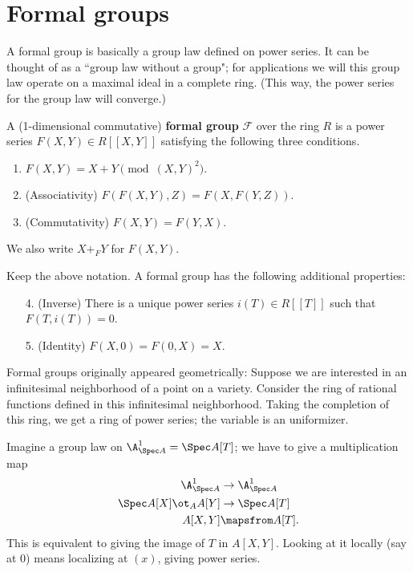 \section{Formal groups}
A formal group is basically a group law defined on power series. It can be thought of as a ``group law without a group"; for applications we will this group law operate on a maximal ideal in a complete ring. (This way, the power series for the group law will converge.)
\begin{df}
A (1-dimensional commutative) \textbf{formal group} $\mathscr F$ over the ring $R$ is a power series $F(X,Y)\in R[[X,Y]]$ satisfying the following three conditions.
\begin{enumerate}
\item
$F(X,Y)=X+Y\pmod{(X,Y)^2}$. %
\item (Associativity)
$F(F(X,Y),Z)=F(X,F(Y,Z))$.
\item (Commutativity)
$F(X,Y)=F(Y,X)$.
\end{enumerate}
We also write $X+_F Y$ for $F(X,Y)$.
\end{df}
\begin{lem} Keep the above notation.
A formal group has the following additional properties:
\begin{enumerate}
\item[4.] (Inverse) There is a unique power series $i(T)\in R[[T]]$ such that $F(T,i(T))=0$.
\item[5.] (Identity) $F(X,0)=F(0,X)=X$.
\end{enumerate}
\end{lem}
Formal groups originally appeared geometrically: Suppose we are interested in an infinitesimal neighborhood of a point on a variety. Consider the ring of rational functions defined in this infinitesimal neighborhood. Taking the completion of this ring, we get a ring of power series; the variable is an uniformizer.

Imagine a group law on $\A^1_{\Spec A}=\Spec A[T]$; we have to give a multiplication map
\begin{align*}
\A^1_{\Spec A}&\to \A^1_{\Spec A} \\
\Spec A[X]\ot_A A[Y] & \to \Spec A[T]\\
A[X,Y] & \mapsfrom A[T].
\end{align*}
This is equivalent to giving the image of $T$ in $A[X,Y]$. Looking at it locally (say at 0) means localizing at $(x)$, giving power series. 

